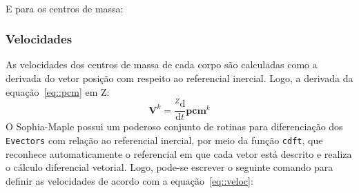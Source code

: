 \medskip {} \\
 \medskip 

E para os centros de massa:

\medskip {} \medskip 


\subsubsection{Velocidades}

As velocidades dos centros de massa de cada corpo são calculadas como a derivada
do vetor posição com respeito ao referencial inercial. Logo, a derivada da
equação~\ref{eq::pcm} em Z:
%
\begin{equation}
	\mathbf{V}^{k} = \frac{^{Z}\mathrm{d} }{\mathrm{d} t}
	\mathbf{pcm}^{k} \label{eq::veloc}
\end{equation}
%
O Sophia-Maple possui um poderoso conjunto de rotinas para diferenciação dos
\texttt{Evectors} com relação ao referencial inercial, por meio da função
\texttt{cdft}, que reconhece automaticamente o referencial em que cada vetor
está descrito e realiza o cálculo diferencial vetorial. Logo, pode-se escrever o
seguinte comando para definir as velocidades de acordo com a
equação~\ref{eq::veloc}:

\medskip {} \medskip 

